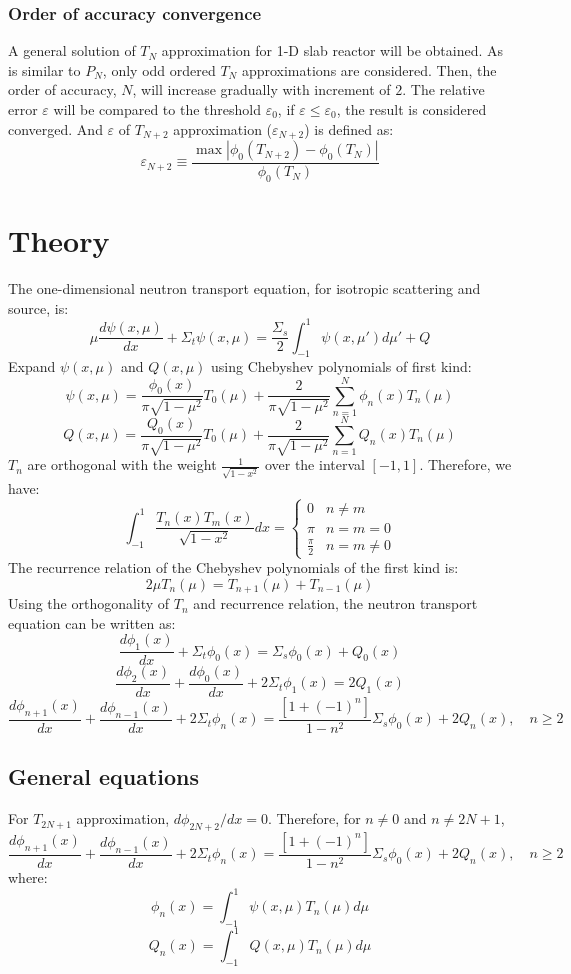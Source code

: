 \documentclass[11pt]{article}
\begin{document}
\begin{spacing}{1.5}
\subsubsection{Order of accuracy convergence}
A general solution of $T_N$ approximation for 1-D slab reactor will be obtained. As is similar to $P_N$, only odd ordered $T_N$ approximations are considered. Then, the order of accuracy, $N$, will increase gradually with increment of $2$. The relative error $\varepsilon$ will be compared to the threshold $\varepsilon_0$, if $\varepsilon\le\varepsilon_0$, the result is considered converged. And $\varepsilon$ of $T_{N+2}$ approximation ($\varepsilon_{N+2}$) is defined as:
\[ 
\varepsilon_{N+2}\equiv\frac{\max\left|\phi_0(T_{N+2})-\phi_0(T_{N})\right|}{\phi_0(T_{N})}
\]
\section{Theory}
The one-dimensional neutron transport equation, for isotropic scattering and source, is:
\[
\mu\frac{d\psi(x,\mu)}{dx}+\Sigma_t\psi(x,\mu)=\frac{\Sigma_s}{2}\int^{1}_{-1}\psi(x,\mu')d\mu'+Q
\]
Expand $\psi(x,\mu)$ and $Q(x,\mu)$ using Chebyshev polynomials of first kind:
\[
\psi(x,\mu)=\frac{\phi_0(x)}{\pi\sqrt{1-\mu^2}}T_0(\mu)+\frac{2}{\pi\sqrt{1-\mu^2}}\sum_{n=1}^{N}\phi_n(x)T_n(\mu)
\]
\[
Q(x,\mu)=\frac{Q_0(x)}{\pi\sqrt{1-\mu^2}}T_0(\mu)+\frac{2}{\pi\sqrt{1-\mu^2}}\sum_{n=1}^{N}Q_n(x)T_n(\mu)
\]
$T_n$ are orthogonal with the weight $\frac{1}{\sqrt{1-x^2}}$ over the interval $[-1,1]$. Therefore, we have:
\[
\int_{-1}^1\frac{T_n(x)T_m(x)}{\sqrt{1-x^2}}dx=\begin{cases}
0&n\ne m\\
\pi&n=m=0\\
\frac{\pi}{2}&n=m\ne0
\end{cases}
\]
The recurrence relation of the Chebyshev polynomials of the first kind is:
\[
2\mu T_n(\mu)=T_{n+1}(\mu)+T_{n-1}(\mu)
\]
Using the orthogonality of $T_n$ and recurrence relation, the neutron transport equation can be written as:
\[
\frac{d\phi_1(x)}{dx}+\Sigma_t\phi_0(x)=\Sigma_s\phi_0(x)+Q_0(x)
\]
\[
\frac{d\phi_2(x)}{dx}+\frac{d\phi_0(x)}{dx}+2\Sigma_t\phi_1(x)=2Q_1(x)
\]
\[
\frac{d\phi_{n+1}(x)}{dx}+\frac{d\phi_{n-1}(x)}{dx}+2\Sigma_t\phi_n(x)=\frac{\left[1+(-1)^n\right]}{1-n^2}\Sigma_s\phi_0(x)+2Q_n(x),\quad n\ge2
\]
\subsection{General equations}
For $T_{2N+1}$ approximation, $d\phi_{2N+2}/dx=0$. Therefore, for $n\ne 0$ and $n\ne2N+1$,
\[
\frac{d\phi_{n+1}(x)}{dx}+\frac{d\phi_{n-1}(x)}{dx}+2\Sigma_t\phi_n(x)=\frac{\left[1+(-1)^n\right]}{1-n^2}\Sigma_s\phi_0(x)+2Q_n(x),\quad n\ge2
\]
where:
\[
\phi_n(x)=\int_{-1}^{1}\psi(x,\mu)T_n(\mu)d\mu
\]
\[
Q_n(x)=\int_{-1}^{1}Q(x,\mu)T_n(\mu)d\mu
\]


\end{spacing}
\end{document}
